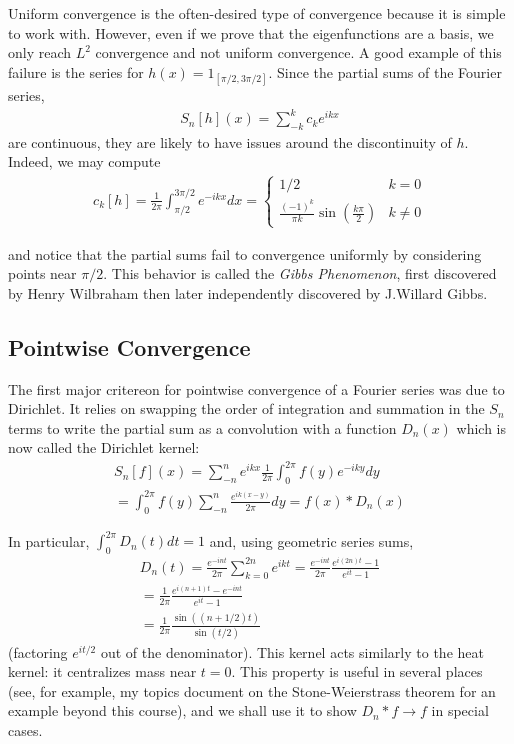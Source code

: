 \documentclass{article}
\begin{document}
	Uniform convergence is the often-desired type of convergence because it is simple to work with. However, even if we prove that the eigenfunctions are a basis, we only reach $L^{2}$ convergence and not uniform convergence. A good example of this failure is the series for $h(x) = 1_{[\pi/2,3\pi/2]}$. Since the partial sums of the Fourier series, 
	\begin{align*}
		S_{n}[h](x) = \sum_{-k}^{k} c_{k}e^{ikx}
	\end{align*}
	are continuous, they are likely to have issues around the discontinuity of $h$. Indeed, we may compute 
	\begin{align*}
		c_{k}[h] = \frac{1}{2\pi} \int_{\pi/2}^{3\pi/2} e^{-ikx}dx = \begin{cases} 1/2 & k=0 \\ \frac{(-1)^{k}}{\pi k} \sin(\frac{k \pi}{2}) & k \neq 0 \end{cases}
	\end{align*}
	
	and notice that the partial sums fail to convergence uniformly by considering points near $\pi /2$. This behavior is called the \textit{Gibbs Phenomenon}, first discovered by Henry Wilbraham then later independently discovered by J.Willard Gibbs. 
	
	\subsection{Pointwise Convergence}
	
	The first major critereon for pointwise convergence of a Fourier series was due to Dirichlet. It relies on swapping the order of integration and summation in the $S_{n}$ terms to write the partial sum as a convolution with a function $D_{n}(x)$ which is now called the Dirichlet kernel:
	\begin{align*}
		S_{n}[f](x) = \sum_{-n}^{n} e^{ikx} \frac{1}{2\pi} \int_{0}^{2\pi} f(y) e^{-iky} dy\\
		= \int_{0}^{2\pi} f(y) \sum_{-n}^{n}  \frac{e^{ik(x-y)}}{2\pi} dy = f(x) * D_{n}(x)
	\end{align*}
	
	In particular, $\int_{0}^{2\pi} D_{n}(t) dt = 1$ and, using geometric series sums,
	\begin{align*}
		D_{n}(t) = \frac{e^{-int}}{2\pi} \sum_{k=0}^{2n} e^{ikt} = \frac{e^{-int}}{2\pi} \frac{e^{i(2n)t}-1}{e^{it}-1} \\
		=\frac{1}{2\pi} \frac{e^{i(n+1)t}-e^{-int}}{e^{it}-1} \\
		= \frac{1}{2\pi} \frac{\sin((n+1/2)t)}{\sin(t/2)}
	\end{align*}
	(factoring $e^{it/2}$ out of the denominator). This kernel acts similarly to the heat kernel: it centralizes mass near $t=0$. This property is useful in several places (see, for example, my topics document on the Stone-Weierstrass theorem for an example beyond this course), and we shall use it to show $D_{n} * f \to f$ in special cases. 
	
\end{document}
